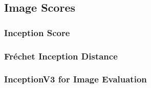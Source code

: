 \subsection{Image Scores}\label{theoretical_image_scores}
\subsubsection[Inception Score - IS]{Inception Score}
\subsubsection[Fréchet Inception Distance - FID]{Fréchet Inception Distance}
\subsubsection[InceptionV3 Model]{InceptionV3 for Image Evaluation}










\newpage
